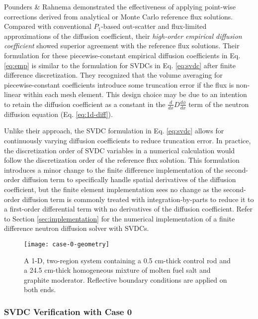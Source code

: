 Pounders \& Rahnema \cite{pounders_diffusion_2009} demonstrated the effectiveness of applying
point-wise corrections derived from analytical or Monte Carlo reference flux solutions. Compared
with conventional $P_1$-based out-scatter and flux-limited approximations of the diffusion
coefficient, their \textit{high-order empirical diffusion coefficient} showed superior agreement
with the reference flux solutions. Their formulation for these piecewise-constant empirical
diffusion coefficients in Eq. \ref{eq:emp} is similar to the formulation for \glspl{SVDC} in Eq.
\ref{eq:svdc} after finite difference discretization. They recognized that the volume
averaging for piecewise-constant coefficients introduce some truncation error if the flux is
non-linear within each mesh element. This design choice may be due to an intention to retain the
diffusion coefficient as a constant in the $\frac{d}{dx}D\frac{d\phi}{dx}$ term of the neutron
diffusion equation (Eq. \ref{eq:1d-diff}).

Unlike their approach, the \gls{SVDC} formulation in Eq. \ref{eq:svdc} allows for continuously
varying diffusion coefficients to reduce truncation error. In practice, the discretization order of
\gls{SVDC} variables in a numerical calculation would follow the discretization order of the
reference flux solution. This formulation introduces a minor change to the finite difference
implementation of the second-order diffusion term to specifically handle spatial derivatives of the
diffusion coefficient, but the finite element implementation sees no change as the second-order
diffusion term is commonly treated with integration-by-parts to reduce it to a first-order
differential term with no derivatives of the diffusion coefficient. Refer to Section
\ref{sec:implementation} for the numerical implementation of a finite difference neutron diffusion
solver with \glspl{SVDC}.

\begin{figure}[htb!]
  \centering
  \texttt{[image: case-0-geometry]}
  \caption{A 1-D, two-region system containing a 0.5 cm-thick control rod and a 24.5 cm-thick
    homogeneous mixture of molten fuel salt and graphite moderator. Reflective boundary conditions
    are applied on both ends.}
  \label{fig:case-0-geom}
\end{figure}

\subsubsection{\gls{SVDC} Verification with Case 0}

